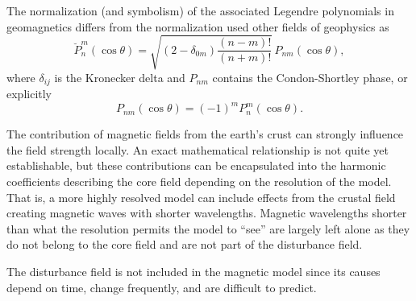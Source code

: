 \documentclass[11pt,dvipsnames]{thesis}
\begin{document}
The normalization (and symbolism) of the associated Legendre polynomials in geomagnetics differs from the normalization used other fields of geophysics as
\begin{equation}
\breve{P}_n^m(\cos\theta) = \sqrt{(2 - \delta_{0m}) \frac{(n - m)!}{(n + m)!}}\, P_{nm}(\cos\theta),
\end{equation}
where $\delta_{ij}$ is the Kronecker delta and $P_{nm}$ contains the Condon-Shortley phase, or explicitly
\begin{equation}
P_{nm}(\cos\theta) = (-1)^m P_n^m(\cos\theta).%
\end{equation}

The contribution of magnetic fields from the earth's crust can strongly influence the field strength locally. An exact mathematical relationship is not quite yet establishable, but these contributions can be encapsulated into the harmonic coefficients describing the core field depending on the resolution of the model. That is, a more highly resolved model can include effects from the crustal field creating magnetic waves with shorter wavelengths. Magnetic wavelengths shorter than what the resolution permits the model to ``see'' are largely left alone as they do not belong to the core field and are not part of the disturbance field.

The disturbance field is not included in the magnetic model since its causes depend on time, change frequently, and are difficult to predict.
\end{document}
